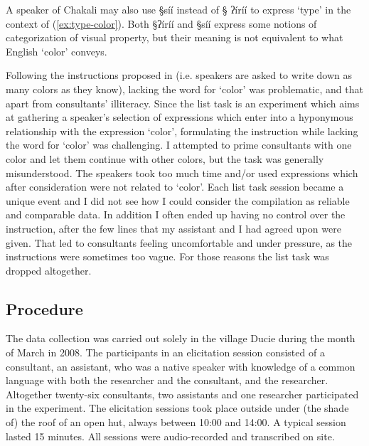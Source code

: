 A speaker of Chakali may also use {\S síí} instead of  {\S
ʔíríí} to express `type' in the context of  
(\ref{ex:type-color}).  Both {\S ʔíríí} and {\S síí} express some notions
of
categorization of visual property, but their meaning is not equivalent to what
English `color' conveys.



Following the   instructions proposed in \citet[27]{Davi95} (i.e. speakers are
asked to write down as many colors as they know),  lacking the word for `color'
was problematic, and  that apart from consultants'  illiteracy. Since
the list task
is an experiment which aims at gathering a speaker's  selection of expressions
which enter into a hyponymous relationship with the expression `color', 
formulating the instruction while  lacking the word for `color' was challenging.
I attempted to prime consultants with one color and let them continue with
other colors, but the task was generally misunderstood. The speakers took 
too much time and/or used expressions which after consideration were
not related to `color'.  Each list task session became a  unique event and I
 did not see how I could consider the compilation as reliable and
comparable data. In addition I often ended up having  no control over the
instruction,
after the few lines that my assistant and I had  agreed
upon were  given.
That led
to consultants feeling uncomfortable and under pressure, as the instructions
were
sometimes  too vague. For those reasons the list task was dropped altogether.


\subsection{Procedure}
\label{sec:procedure}

The data collection was carried out solely in the village Ducie during the month
of March in 2008. The participants in an elicitation session consisted of a
consultant, an assistant, who  was a native speaker with knowledge of  a common
language with both the researcher  and the consultant, and the researcher.
Altogether twenty-six consultants,  two assistants and one researcher
participated in the experiment. The elicitation sessions took place outside
under (the shade of) the roof of an open hut, always between 10:00 and 14:00. A
typical session lasted 15 minutes.  All sessions were audio-recorded and
transcribed on site.


